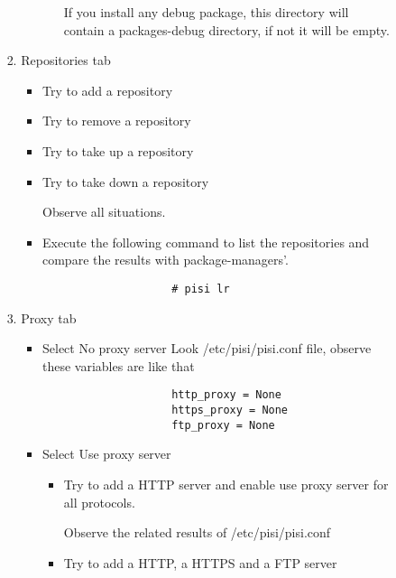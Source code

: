 \documentclass[a4paper,10pt]{article}
\begin{document}
\begin{enumerate}
\begin{enumerate}
\begin{enumerate}
\begin{enumerate}
\begin{itemize}
\begin{itemize}
                        If you install any debug package, this directory will contain a packages-debug directory, if not it will be empty.
                    \end{itemize}
                \end{itemize} 
                \item Repositories tab
                \begin{itemize}
                    \item Try to add a repository
                    \item Try to remove a repository
                    \item Try to take up a repository
                    \item Try to take down a repository 

                    Observe all situations.
                    \item Execute the following command to list the repositories and compare the results with package-managers'.
                    \begin{verbatim}
                    # pisi lr
                    \end{verbatim}
                \end{itemize}
                \item Proxy tab
                \begin{itemize}
                    \item  Select No proxy server 
                    Look /etc/pisi/pisi.conf file, observe these variables are like that
                    \begin{verbatim}
                    http_proxy = None
                    https_proxy = None
                    ftp_proxy = None
                    \end{verbatim}
    
                    \item Select Use proxy server
    
                    \begin{itemize}
                        \item Try to add a HTTP server and enable use proxy server for all protocols.
        
                        Observe the related results of /etc/pisi/pisi.conf
        
                        \item Try to add a HTTP, a HTTPS and a FTP server
        

\end{itemize}
\end{itemize}
\end{enumerate}
\end{enumerate}
\end{enumerate}
\end{enumerate}
\end{document}
